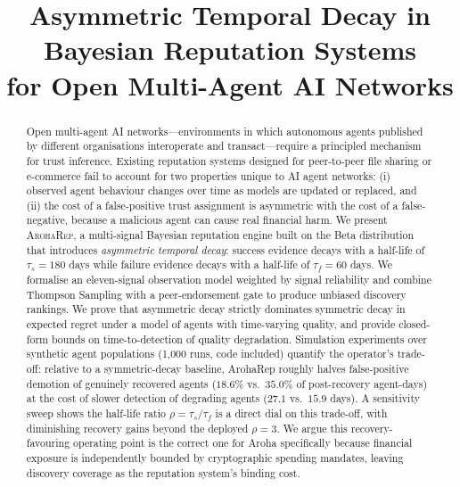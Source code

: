 \documentclass[conference]{IEEEtran}
\begin{document}
\title{Asymmetric Temporal Decay in Bayesian Reputation Systems\\
       for Open Multi-Agent AI Networks}

\author{
}

\maketitle

\begin{abstract}
Open multi-agent AI networks—environments in which autonomous
agents published by different organisations interoperate and
transact—require a principled mechanism for trust inference.
Existing reputation systems designed for peer-to-peer file
sharing or e-commerce fail to account for two properties
unique to AI agent networks: (i) observed agent behaviour
changes over time as models are updated or replaced, and
(ii) the cost of a false-positive trust assignment is
asymmetric with the cost of a false-negative, because a
malicious agent can cause real financial harm.
We present \textsc{ArohaRep}, a multi-signal Bayesian
reputation engine built on the Beta distribution that
introduces \emph{asymmetric temporal decay}: success evidence
decays with a half-life of $\tau_s = 180$ days while failure
evidence decays with a half-life of $\tau_f = 60$ days.
We formalise an eleven-signal observation model weighted by
signal reliability and combine Thompson Sampling with a
peer-endorsement gate to produce unbiased discovery rankings.
We prove that asymmetric decay strictly dominates symmetric
decay in expected regret under a model of agents with
time-varying quality, and provide closed-form bounds on
time-to-detection of quality degradation. Simulation
experiments over synthetic agent populations (1{,}000 runs,
code included) quantify the operator's trade-off: relative to
a symmetric-decay baseline, ArohaRep roughly halves
false-positive demotion of genuinely recovered agents
($18.6\%$ vs.\ $35.0\%$ of post-recovery agent-days) at the
cost of slower detection of degrading agents ($27.1$ vs.\
$15.9$ days). A sensitivity sweep shows the half-life ratio
$\rho = \tau_s/\tau_f$ is a direct dial on this trade-off,
with diminishing recovery gains beyond the deployed
$\rho = 3$. We argue this recovery-favouring operating point
is the correct one for Aroha specifically because financial
exposure is independently bounded by cryptographic spending
mandates, leaving discovery coverage as the reputation
system's binding cost.
\end{abstract}
\end{document}
